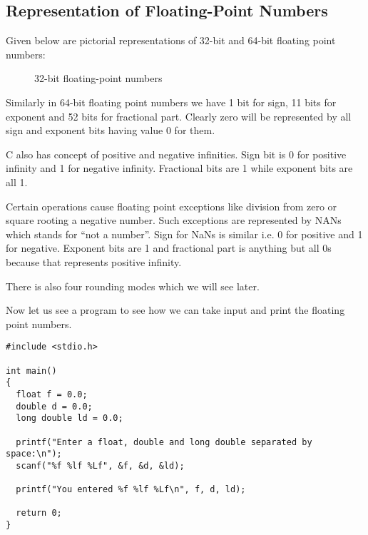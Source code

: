 \subsection{Representation of Floating-Point Numbers}
Given below are pictorial representations of 32-bit and 64-bit floating point
numbers:
\begin{figure}[H]
\begin{center}
\caption{32-bit floating-point numbers}
\label{fig:32-bit floating point numbers}
\end{center}
\end{figure}

Similarly in 64-bit floating point numbers we have 1 bit for sign, 11 bits for
exponent and 52 bits for fractional part. Clearly zero will be represented by
all sign and exponent bits having value 0 for them.

C also has concept of positive and negative infinities. Sign bit is 0 for
positive infinity and 1 for negative infinity. Fractional bits are 1 while
exponent bits are all 1.

Certain operations cause floating point exceptions like division from zero or
square rooting a negative number. Such exceptions are represented by NANs which
stands for ``not a number''. Sign for NaNs is similar i.e. 0 for positive and 1
for negative. Exponent bits are 1 and fractional part is anything but all 0s
because that represents positive infinity.

There is also four rounding modes which we will see later.

Now let us see a program to see how we can take input and print the floating
point numbers.

\begin{verbatim}
#include <stdio.h>

int main()
{
  float f = 0.0;
  double d = 0.0;
  long double ld = 0.0;

  printf("Enter a float, double and long double separated by space:\n");
  scanf("%f %lf %Lf", &f, &d, &ld);

  printf("You entered %f %lf %Lf\n", f, d, ld);

  return 0;
}
\end{verbatim}

